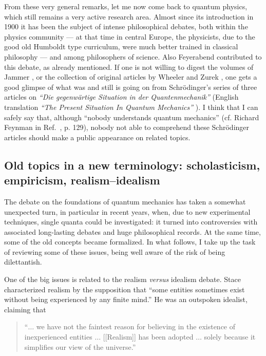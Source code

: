 \documentclass{article}
\begin{document}
From these very general remarks, let me now come back to quantum physics, which still remains
a very active research area.
Almost since its introduction in 1900 it has been the subject of intense philosophical debates,
both within the physics community ---
at that time in central Europe, the physicists, due to the good old Humboldt type curriculum,
were much better trained  in classical philosophy ---  and among philosophers of science.
Also Feyerabend contributed to this debate, as already mentioned.
If one is not willing to digest the volumes of Jammer
\cite{jammer:66,jammer1,jammer-92},
or the collection of original articles by Wheeler and Zurek \cite{wheeler-Zurek:83},
one gets a good glimpse of what was and still is going on from Schr\"odinger's
series of three articles on {\em ``Die gegenw{\"{a}}rtige {S}ituation in der {Q}uantenmechanik''} \cite{schrodinger}
(English translation {\em ``The Present Situation In Quantum Mechanics''} \cite[pp. 152-167]{wheeler-Zurek:83}).
I think that I can safely say that, although { ``nobody understands quantum mechanics''}
(cf. Richard Feynman in Ref.~\cite{feynman-law}, p. 129),
nobody not able to comprehend these Schr\"odinger articles should make a public appearance
on related topics.


\subsection{Old topics in a new terminology: scholasticism, empiricism, realism--idealism}

The debate on the foundations of quantum mechanics has taken a somewhat unexpected turn,
in particular in recent years, when, due to new experimental techniques, single quanta
could be investigated:
it turned into controversies with associated long-lasting debates and  huge philosophical records.
At the same time, some of the old concepts became formalized.
In what follows, I take up the task of reviewing some of these issues,
being well aware of the risk of being dilettantish.

One of the big issues is related to the realism {\it versus} idealism debate.
Stace \cite{stace} characterized realism by the
supposition that
{ ``some entities sometimes exist without being experienced by any finite mind.''}
He was an outspoken idealist, claiming that
\begin{quote}
{ ``$\ldots$
we have not the faintest reason for believing in the existence of
inexperienced entities
$\ldots$
[[Realism]] has been adopted
$\ldots$
solely because it simplifies our view of the universe.''}
\end{quote}
\end{document}
